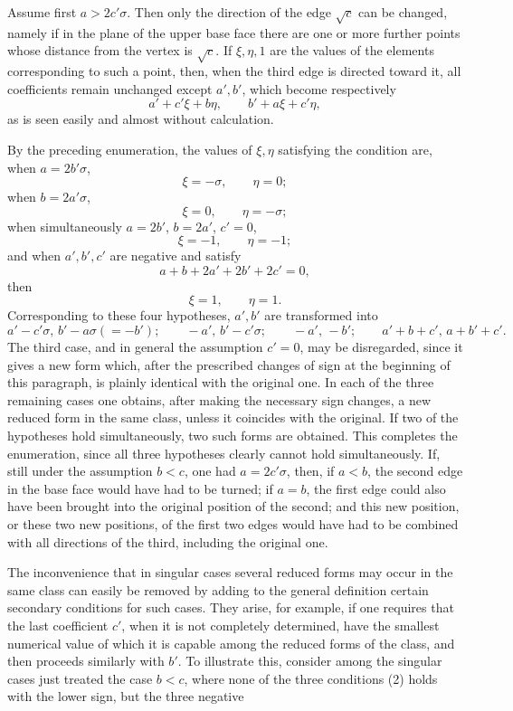 \documentclass[11pt]{article}
\begin{document}
Assume first $a>2c'\sigma$. Then only the direction of the edge $\sqrt c$ can be changed, namely if in the plane of the upper base face there are one or more further points whose distance from the vertex is $\sqrt c$. If $\xi,\eta,1$ are the values of the elements corresponding to such a point, then, when the third edge is directed toward it, all coefficients remain unchanged except $a',b'$, which become respectively
\[
 a'+c'\xi+b\eta,
 \qquad b'+a\xi+c'\eta,
\]
as is seen easily and almost without calculation.

By the preceding enumeration, the values of $\xi,\eta$ satisfying the condition are, when $a=2b'\sigma$,
\[
 \xi=-\sigma,
 \qquad \eta=0;
\]
when $b=2a'\sigma$,
\[
 \xi=0,
 \qquad \eta=-\sigma;
\]
when simultaneously $a=2b'$, $b=2a'$, $c'=0$,
\[
 \xi=-1,
 \qquad \eta=-1;
\]
and when $a',b',c'$ are negative and satisfy
\[
 a+b+2a'+2b'+2c'=0,
\]
then
\[
 \xi=1,
 \qquad \eta=1.
\]
Corresponding to these four hypotheses, $a',b'$ are transformed into
\[
 a'-c'\sigma,\, b'-a\sigma(=-b');
 \qquad -a',\, b'-c'\sigma;
 \qquad -a',\, -b';
 \qquad a'+b+c',\, a+b'+c'.
\]
The third case, and in general the assumption $c'=0$, may be disregarded, since it gives a new form which, after the prescribed changes of sign at the beginning of this paragraph, is plainly identical with the original one. In each of the three remaining cases one obtains, after making the necessary sign changes, a new reduced form in the same class, unless it coincides with the original. If two of the hypotheses hold simultaneously, two such forms are obtained. This completes the enumeration, since all three hypotheses clearly cannot hold simultaneously. If, still under the assumption $b<c$, one had $a=2c'\sigma$, then, if $a<b$, the second edge in the base face would have had to be turned; if $a=b$, the first edge could also have been brought into the original position of the second; and this new position, or these two new positions, of the first two edges would have had to be combined with all directions of the third, including the original one.

The inconvenience that in singular cases several reduced forms may occur in the same class can easily be removed by adding to the general definition certain secondary conditions for such cases. They arise, for example, if one requires that the last coefficient $c'$, when it is not completely determined, have the smallest numerical value of which it is capable among the reduced forms of the class, and then proceeds similarly with $b'$. To illustrate this, consider among the singular cases just treated the case $b<c$, where none of the three conditions (2) holds with the lower sign, but the three negative
\end{document}
